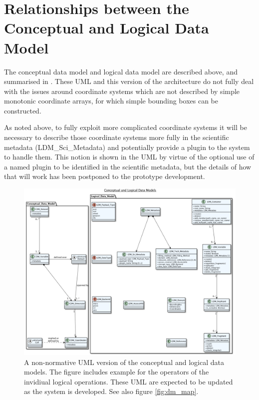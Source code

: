 \section{Relationships between the Conceptual and Logical Data Model}
\label{subsec-mapping}

The conceptual data model and logical data model are described above, and summarised in .
These UML and this version of the architecture do not fully deal with the issues around coordinate systems which are not described by simple monotonic coordinate arrays, for which simple bounding boxes can be constructed.

As noted above, to fully exploit more complicated coordinate systems it will be necessary to describe those coordinate systems more fully in the scientific metadata (LDM\_Sci\_Metadata) and potentially provide a plugin to the system to handle them.
This notion is shown in the UML by virtue of the optional use of a named plugin to be identified in the scientific metadata, but the details of how that will work has been postponed to the prototype development.

\begin{figure}
	\centering
	\includegraphics[width=\textwidth]{figures/cdm_ldm}
	\caption{A non-normative UML version of the conceptual and logical data models.
	The figure includes example for the operators of the invidiual logical operations.
	These UML are expected to be updated as the system is developed.  See also figure \ref{fig:dm_map}.}
	\label{fig:cdm_ldm}
\end{figure}

